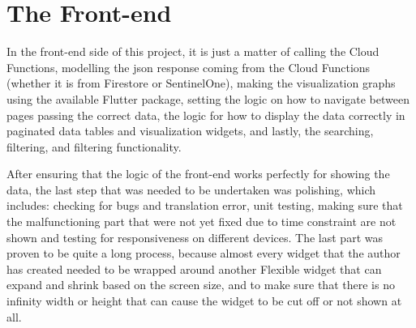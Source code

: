 \section{The Front-end}

In the front-end side of this project, it is just a matter of calling the Cloud Functions, modelling the \acrshort{json} response
coming from the Cloud Functions (whether it is from Firestore or SentinelOne), making the visualization graphs using the available
Flutter package, setting the logic on how to navigate between pages passing the correct data, the logic for how to display the data
correctly in paginated data tables and visualization widgets, and lastly, the searching, filtering, and filtering functionality.

After ensuring that the logic of the front-end works perfectly for showing the data, the last step that was needed to be undertaken
was polishing, which includes: checking for bugs and translation error, unit testing, making sure that the malfunctioning part that
were not yet fixed due to time constraint are not shown and testing for responsiveness on different devices. The last part was
proven to be quite a long process, because almost every widget that the author has created needed to be wrapped around another
Flexible widget that can expand and shrink based on the screen size, and to make sure that there is no infinity width or height
that can cause the widget to be cut off or not shown at all.




